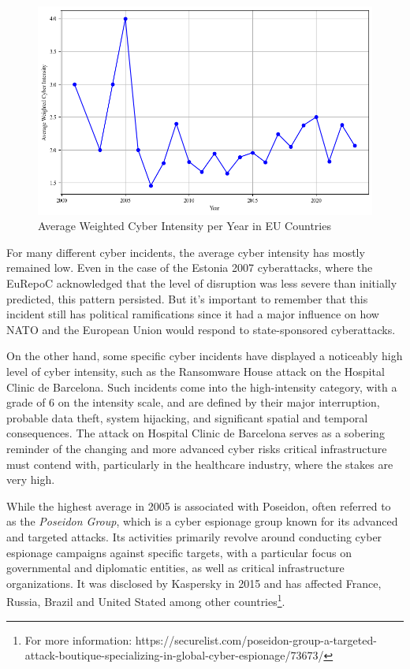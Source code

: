 \begin{figure}[H]
    \centering
    \includegraphics[width=\textwidth]{Images/avg.png}
    \caption{Average Weighted Cyber Intensity per Year in EU Countries}
    \label{fig:avg}
\end{figure}

For many different cyber incidents, the average cyber intensity has mostly remained low. Even in the case of the Estonia 2007 cyberattacks, where the EuRepoC acknowledged that the level of disruption was less severe than initially predicted, this pattern persisted. But it's important to remember that this incident still has political ramifications since it had a major influence on how NATO and the European Union would respond to state-sponsored cyberattacks.

On the other hand, some specific cyber incidents have displayed a noticeably high level of cyber intensity, such as the Ransomware House attack on the Hospital Clinic de Barcelona. Such incidents come into the high-intensity category, with a grade of 6 on the intensity scale, and are defined by their major interruption, probable data theft, system hijacking, and significant spatial and temporal consequences. The attack on Hospital Clinic de Barcelona serves as a sobering reminder of the changing and more advanced cyber risks critical infrastructure must contend with, particularly in the healthcare industry, where the stakes are very high.  

While the highest average in 2005 is associated with Poseidon, often referred to as the \textit{Poseidon Group}, which is a cyber espionage group known for its advanced and targeted attacks. Its activities primarily revolve around conducting cyber espionage campaigns against specific targets, with a particular focus on governmental and diplomatic entities, as well as critical infrastructure organizations. It was disclosed by Kaspersky in 2015 and has affected France, Russia, Brazil and United Stated among other countries\footnote{For more information: https://securelist.com/poseidon-group-a-targeted-attack-boutique-specializing-in-global-cyber-espionage/73673/}.
